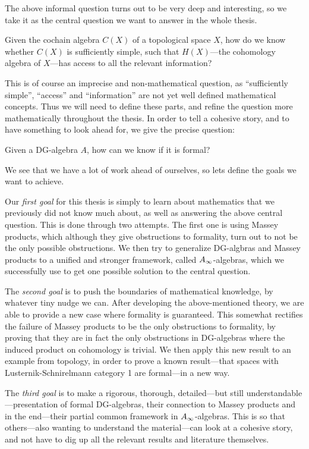 The above informal question turns out to be very deep and interesting, so we take it as the central question we want to answer in the whole thesis. 

\begin{central}
Given the cochain algebra $C(X)$ of a topological space $X$, how do we know whether $C(X)$ is sufficiently simple, such that $H(X)$---the cohomology algebra of $X$---has access to all the relevant information?
\end{central}

This is of course an imprecise and non-mathematical question, as ``sufficiently simple'', ``access'' and ``information'' are not yet well defined mathematical concepts. Thus we will need to define these parts, and refine the question more mathematically throughout the thesis. In order to tell a cohesive story, and to have something to look ahead for, we give the precise question:

\begin{central}
Given a DG-algebra $A$, how can we know if it is formal?
\end{central}

We see that we have a lot of work ahead of ourselves, so lets define the goals we want to achieve. 

Our \textit{first goal} for this thesis is simply to learn about mathematics that we previously did not know much about, as well as answering the above central question. This is done through two attempts. The first one is using Massey products, which although they give obstructions to formality, turn out to not be the only possible obstructions. We then try to generalize DG-algbras and Massey products to a unified and stronger framework, called $A_{\infty}$-algebras, which we successfully use to get one possible solution to the central question. 

The \textit{second goal} is to push the boundaries of mathematical knowledge, by whatever tiny nudge we can. After developing the above-mentioned theory, we are able to provide a new case where formality is guaranteed. This somewhat rectifies the failure of Massey products to be the only obstructions to formality, by proving that they are in fact the only obstructions in DG-algebras where the induced product on cohomology is trivial. We then apply this new result to an example from topology, in order to prove a known result---that spaces with Lusternik-Schnirelmann category 1 are formal---in a new way. 

The \textit{third goal} is to make a rigorous, thorough, detailed---but still understandable---presentation of formal DG-algebras, their connection to Massey products and in the end---their partial common framework in $A_{\infty}$-algebras. This is so that others---also wanting to understand the material---can look at a cohesive story, and not have to dig up all the relevant results and literature themselves. 
 
 






